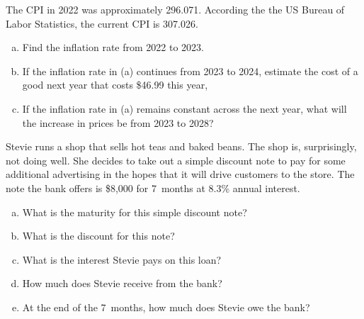 \documentclass[11pt,letterpaper]{article}
\begin{document}

 The CPI in 2022 was approximately 296.071. According the the US Bureau of Labor Statistics, the current CPI is 307.026.
	\begin{enumerate}[(a)]
	\item Find the inflation rate from 2022 to 2023. 
	\item If the inflation rate in (a) continues from 2023 to 2024, estimate the cost of a good next year that costs \$46.99 this year,
	\item If the inflation rate in (a) remains constant across the next year, what will the increase in prices be from 2023 to 2028? 
	\end{enumerate}



\newpage



 Stevie runs a shop that sells hot teas and baked beans. The shop is, surprisingly, not doing well. She decides to take out a simple discount note to pay for some additional advertising in the hopes that it will drive customers to the store. The note the bank offers is \$8,000 for 7~months at 8.3\% annual interest.
	\begin{enumerate}[(a)]
	\item What is the maturity for this simple discount note?
	\item What is the discount for this note?
	\item What is the interest Stevie pays on this loan?
	\item How much does Stevie receive from the bank?
	\item At the end of the 7~months, how much does Stevie owe the bank?
	\end{enumerate}
\end{document}
